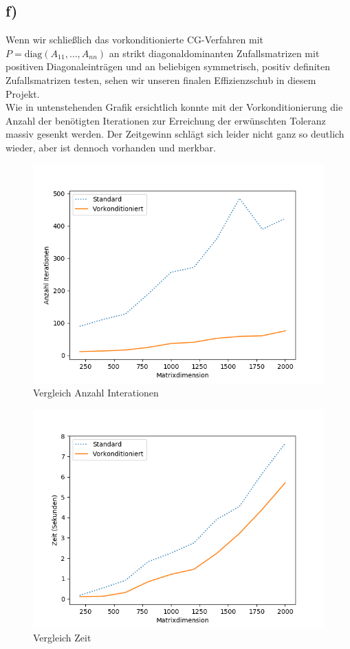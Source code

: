 \subsection*{f)}
Wenn wir schließlich das vorkonditionierte CG-Verfahren mit $P = \text{diag}(A_{11},\dots,A_{nn})$ an strikt diagonaldominanten
Zufallsmatrizen mit positiven Diagonaleinträgen und an beliebigen symmetrisch, positiv definiten Zufallsmatrizen testen, sehen
wir unseren finalen Effizienzschub in diesem Projekt. \\
Wie in untenstehenden Grafik ersichtlich konnte mit der Vorkonditionierung die Anzahl der benötigten Iterationen
zur Erreichung der erwünschten Toleranz massiv gesenkt werden. Der Zeitgewinn schlägt sich leider nicht ganz so deutlich wieder,
aber ist dennoch vorhanden und merkbar.
\begin{figure}
    \centering
    \includegraphics[width=\linewidth]{Aufgabe_1/f.png}
    \caption{Vergleich Anzahl Interationen}
    \label{fig:my_label}
\end{figure}
\begin{figure}
    \centering
    \includegraphics[width=\linewidth]{Aufgabe_1/vcg.png}
    \caption{Vergleich Zeit}
    \label{fig:my_label}
\end{figure}
